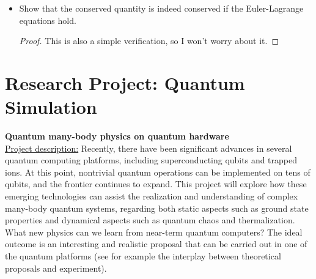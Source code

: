 \documentclass{book}
\theoremstyle{definition}
\begin{document}
\begin{itemize}
	\item Show that the conserved quantity is indeed conserved if the Euler-Lagrange equations hold. 
	\begin{proof}
	This is also a simple verification, so I won't worry about it. 
	\end{proof}

	
\end{itemize}


































\newpage



\chapter{Research Project: Quantum Simulation}

\textbf{Quantum many-body physics on quantum hardware}\\


\underline{Project description:} Recently, there have been significant advances in several quantum computing platforms, including superconducting qubits and trapped ions. At this point, nontrivial quantum operations can be implemented
on tens of qubits, and the frontier continues to expand. This project will explore how these emerging
technologies can assist the realization and understanding of complex many-body quantum systems,
regarding both static aspects such as ground state properties and dynamical aspects such as quantum chaos
and thermalization. What new physics can we learn from near-term quantum computers? The ideal
outcome is an interesting and realistic proposal that can be carried out in one of the quantum platforms (see
for example the interplay between theoretical proposals and experiment).
\end{document}
